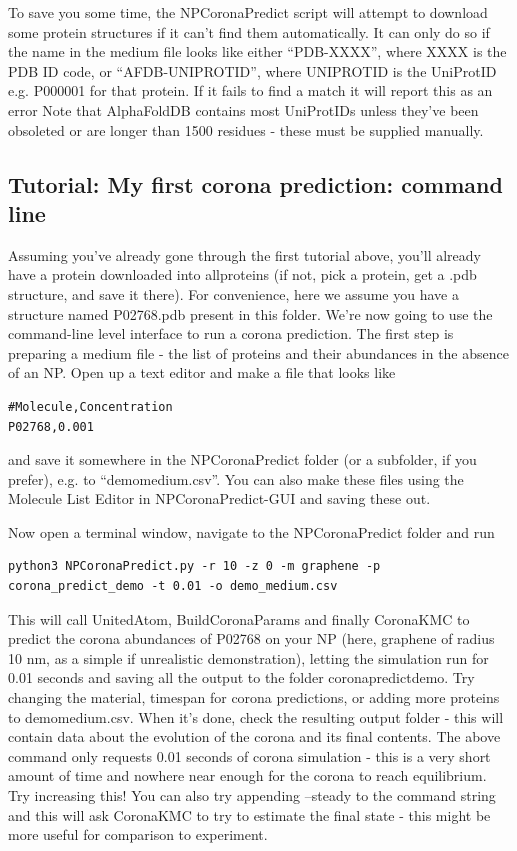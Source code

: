 \documentclass[10pt,a4paper,onecolumn]{report}
\begin{document}
To save you some time, the NPCoronaPredict script will attempt to download some protein structures if it can't find them automatically. It can only do so if the name in the medium file looks like either ``PDB-XXXX'', where XXXX is the PDB ID code, or ``AFDB-UNIPROTID'', where UNIPROTID is the UniProtID e.g. P000001 for that protein. If it fails to find a match it will report this as an error
Note that AlphaFoldDB contains most UniProtIDs unless they've been obsoleted or are longer than 1500 residues - these must be supplied manually. 
 

\subsection{Tutorial: My first corona prediction: command line} \label{section:firstCorona}
Assuming you've already gone through the first tutorial above, you'll already have a protein downloaded into all\textunderscore proteins (if not, pick a protein, get a .pdb structure, and save it there). For convenience, here we assume you have a structure named P02768.pdb present in this folder. We're now going to use the command-line level interface to run a corona prediction.
The first step is preparing a medium file - the list of proteins and their abundances in the absence of an NP. Open up a text editor and make a file that looks like

\begin{lstlisting}
#Molecule,Concentration
P02768,0.001
\end{lstlisting}
and save it somewhere in the NPCoronaPredict folder (or a subfolder, if you prefer), e.g. to ``demo\textunderscore medium.csv''. You can also make these files using the Molecule List Editor in NPCoronaPredict-GUI and saving these out.


 Now open a terminal window, navigate to the NPCoronaPredict folder and run

\begin{lstlisting}
python3 NPCoronaPredict.py -r 10 -z 0 -m graphene -p corona_predict_demo -t 0.01 -o demo_medium.csv
\end{lstlisting}
This will call UnitedAtom, BuildCoronaParams and finally CoronaKMC to predict the corona abundances of P02768 on your NP (here, graphene of radius 10 nm, as a simple if unrealistic demonstration), letting the simulation run for 0.01 seconds and saving all the output to the folder corona\textunderscore predict\textunderscore demo.  
Try changing the material, timespan for corona predictions, or adding more proteins to demo\textunderscore medium.csv. When it's done, check the resulting output folder - this will contain data about the evolution of the corona and its final contents.
The above command only requests 0.01 seconds of corona simulation - this is a very short amount of time and nowhere near enough for the corona to reach equilibrium. Try increasing this! You can also try appending --steady to the command string and this will ask CoronaKMC to try to estimate the final state - this might be more useful for comparison to experiment.
\end{document}

